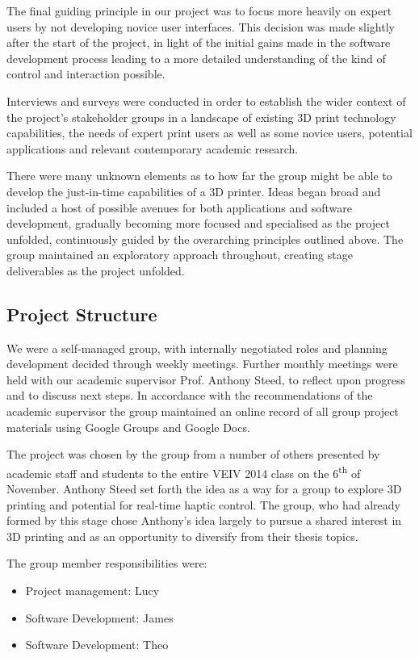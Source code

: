 \documentclass[11pt]{article} %
\begin{document}
The final guiding principle in our project was to focus more heavily on expert users by not developing novice user interfaces. This decision was made slightly after the start of the project, in light of the initial gains made in the software development process leading to a more detailed understanding of the kind of control and interaction possible. 

Interviews and surveys were conducted in order to establish the wider context of the project's stakeholder groups in a landscape of existing 3D print technology capabilities, the needs of expert print users as well as some novice users, potential applications and relevant contemporary academic research.  

There were many unknown elements as to how far the group might be able to develop the just-in-time capabilities of a 3D printer. Ideas began broad and included a host of possible avenues for both applications and software development, gradually becoming more focused and specialised as the project unfolded, continuously guided by the overarching principles outlined above. The group maintained an exploratory approach throughout, creating stage deliverables as the project unfolded. 




\subsection{Project Structure}
We were a self-managed group, with internally negotiated roles and planning development decided through weekly meetings. Further monthly meetings were held with our academic supervisor Prof. Anthony Steed, to reflect upon progress and to discuss next steps.  In accordance with the recommendations of the academic supervisor the group maintained an online record of all group project materials using Google Groups and Google Docs. 

The project was chosen by the group from a number of others presented by academic staff and students to the entire VEIV 2014 class on the 6\textsuperscript{th} of November. Anthony Steed set forth the idea as a way for a group to explore 3D printing and potential for real-time haptic control. The group, who had already formed by this stage chose Anthony's idea largely to pursue a shared interest in 3D printing and as an opportunity to diversify from their thesis topics. 

The group member responsibilities were:
\begin{itemize}
\item Project management: Lucy
\item Software Development: James
\item Software Development: Theo
\end{itemize}
\end{document}
